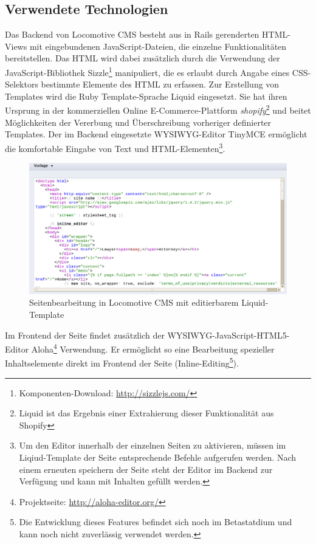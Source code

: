 \subsection{Verwendete Technologien}
\label{sec:TechnologienLocomotive}
Das Backend von Locomotive CMS besteht aus in Rails gerenderten HTML-Views mit eingebundenen JavaScript-Dateien, die einzelne Funktionalitäten bereitstellen. Das HTML wird dabei zusätzlich durch die Verwendung der JavaScript-Bibliothek Sizzle\footnote{Komponenten-Download: \href{http://sizzlejs.com/}{http://sizzlejs.com/}} manipuliert, die es erlaubt durch Angabe eines CSS-Selektors bestimmte Elemente des HTML zu erfassen.
Zur Erstellung von Templates wird die Ruby Template-Sprache Liquid eingesetzt. Sie hat ihren Ursprung in der kommerziellen Online E-Commerce-Plattform \emph{shopify}\footnote{Liquid ist das Ergebnis einer Extrahierung dieser Funktionalität aus Shopify} und beitet Möglichkeiten der Vererbung und Überschreibung vorheriger definierter Templates.
Der im Backend eingesetzte WYSIWYG-Editor TinyMCE ermöglicht die komfortable Eingabe von Text und HTML-Elementen\footnote{Um den Editor innerhalb der einzelnen Seiten zu aktivieren, müssen im Liqiud-Template der Seite entsprechende Befehle aufgerufen werden. Nach einem erneuten speichern der Seite steht der Editor im Backend zur Verfügung und kann mit Inhalten gefüllt werden.}.

\begin{figure}[!h]
\begin{center}
\includegraphics[scale=0.4]{images/analyse/locomotive/liquid.png}
\caption{Seitenbearbeitung in Locomotive CMS mit editierbarem Liquid-Template}
\label{locomotivecontent}
\end{center}
\end{figure}

Im Frontend der Seite findet zusätzlich der WYSIWYG-JavaScript-HTML5-Editor Aloha\footnote{Projektseite: \href{http://aloha-editor.org/}{http://aloha-editor.org/}} Verwendung. Er ermöglicht so eine Bearbeitung spezieller Inhaltselemente direkt im Frontend der Seite (Inline-Editing\footnote{Die Entwicklung dieses Features befindet sich noch im Betastatdium und kann noch nicht zuverlässig verwendet werden.}).

